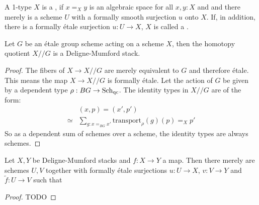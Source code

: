 
\begin{definition}
  A 1-type $X$ is a ,
  if $x=_Xy$ is an algebraic space for all $x,y:X$ and
  and there merely is a scheme $U$ with a formally smooth surjection $u$ onto $X$.
  If, in addition, there is a
  formally étale surjection $u:U\to X$,
  $X$ is called a .
\end{definition}

\begin{proposition}
  Let $G$ be an étale group scheme acting on a scheme $X$,
  then the homotopy quotient $X//G$ is a Deligne-Mumford stack.
\end{proposition}

\begin{proof}
  The fibers of $X\to X//G$ are merely equivalent to $G$
  and therefore étale.
  This means the map $X\to X//G$ is formally étale.
  Let the action of $G$ be given by a dependent type
  $\rho:BG\to \operatorname{\mathrm{Sch}_{qc}}$.
  The identity types in $X//G$ are of the form:
  \begin{align*}
    &(x,p)=(x',p') \\
    \simeq& \sum_{g:x=_{BG}x'}\mathrm{transport}_{\rho}(g)(p)=_Xp'
  \end{align*}
  So as a dependent sum of schemes over a scheme,
  the identity types are always schemes. 
\end{proof}

\begin{lemma}
  Let $X,Y$ be Deligne-Mumford stacks and $f:X\to Y$ a map.
  Then there merely are schemes $U,V$ together with formally étale surjections
  $u:U\to X$, $v:V\to Y$ and $\widetilde{f}:U\to V$ such that
  \begin{center}
  \end{center}
\end{lemma}

\begin{proof}
  TODO
\end{proof}